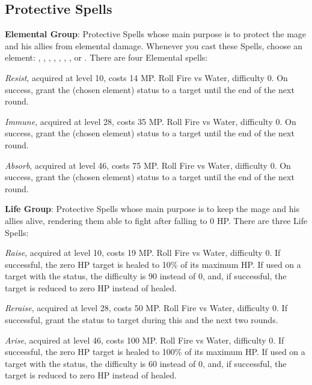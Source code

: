 \begin{multicols}{2}
    \subsection{Protective Spells}\label{subsec:white-protective}

    \textbf{Elemental Group}: Protective Spells whose main purpose is to protect the mage and his allies from elemental damage. Whenever you cast these Spells, choose an element: , , , , , , ,  or . There are four Elemental spells:

    \textit{Resist}, acquired at level 10, costs 14 MP\@. Roll Fire vs Water, difficulty 0. On success, grant the  (chosen element) status to a target until the end of the next round.

    \textit{Immune}, acquired at level 28, costs 35 MP\@. Roll Fire vs Water, difficulty 0. On success, grant the  (chosen element) status to a target until the end of the next round.

    \textit{Absorb}, acquired at level 46, costs 75 MP\@. Roll Fire vs Water, difficulty 0. On success, grant the  (chosen element) status to a target until the end of the next round.

    \ffcrystal[type=level,height=8pt]

    \textbf{Life Group}: Protective Spells whose main purpose is to keep the mage and his allies alive, rendering them able to fight after falling to 0 HP\@. There are three Life Spells:

    \textit{Raise}, acquired at level 10, costs 19 MP\@. Roll Fire vs Water, difficulty 0. If successful, the zero HP target is healed to 10\% of its maximum HP\@. If used on a target with the  status, the difficulty is 90 instead of 0, and, if successful, the target is reduced to zero HP instead of healed.

    \textit{Reraise}, acquired at level 28, costs 50 MP\@. Roll Fire vs Water, difficulty 0. If successful, grant the  status to target during this and the next two rounds.

    \textit{Arise}, acquired at level 46, costs 100 MP\@. Roll Fire vs Water, difficulty 0. If successful, the zero HP target is healed to 100\% of its maximum HP\@. If used on a target with the  status, the difficulty is 60 instead of 0, and, if successful, the target is reduced to zero HP instead of healed.


\end{multicols}

